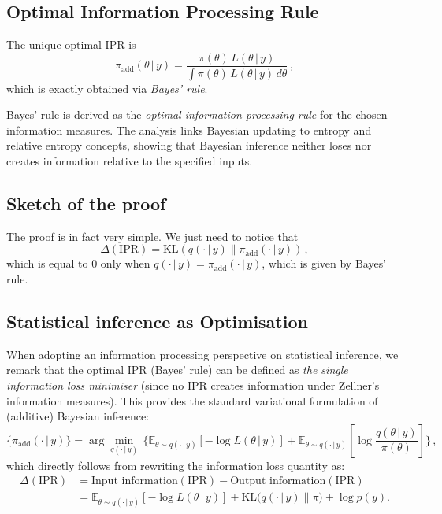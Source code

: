 \documentclass[accepted]{uai2026} %
\def\given{\,|\,}
\theoremstyle{remark}
\begin{document}
\subsection*{Optimal Information Processing Rule}

The unique optimal IPR is
\[
\pi_{\textrm{add}}(\theta \given y)
= \frac{\pi(\theta)\, L(\theta \given y)}
{\int \pi(\theta)\, L(\theta \given y)\, d\theta} \, ,
\]
which is exactly obtained via \emph{Bayes' rule}.

\vspace{0.2cm}

Bayes' rule is derived as the \emph{optimal information processing rule} for the chosen information measures. The analysis links Bayesian updating to entropy and relative entropy concepts, showing that Bayesian inference neither loses nor creates information relative to the specified inputs.


\subsection*{Sketch of the proof}

The proof is in fact very simple. We just need to notice that
$$
\Delta(\text{IPR}) = \mathrm{KL}\left(q(\cdot \given y) \| \pi_{\textrm{add}}(\cdot \given y) \right) \, ,
$$
which is equal to $0$ only when $q(\cdot \given y)=\pi_{\textrm{add}}(\cdot \given y)$, which is given by Bayes' rule.


\subsection*{Statistical inference as Optimisation}

When adopting an information processing perspective on statistical inference, we remark that the optimal IPR (Bayes' rule) can be defined as \emph{the single information loss minimiser} (since no IPR creates information under Zellner's information measures). This provides the standard variational formulation of (additive) Bayesian inference:
$$
\big\{ \pi_{\textrm{add}}(\cdot \given y) \big\} = \arg\min_{q(\cdot\given y)} \, \bigg\{ \mathbb{E}_{\theta\sim q(\cdot\given y)}\left[- \log L(\theta \given y)\right] + \mathbb{E}_{\theta\sim q(\cdot\given y)}\left[\log \frac{q(\theta\given y)}{\pi(\theta)}\right] \bigg\} \, ,
$$
which directly follows from rewriting the information loss quantity as:
\begin{align*}
\Delta(\text{IPR}) & = \text{Input information}(\text{IPR}) - \text{Output information}(\text{IPR}) \\
& = \mathbb{E}_{\theta\sim q(\cdot\given y)}\left[- \log L(\theta \given y)\right] + \mathrm{KL}\big(q(\cdot\given y)\|\pi\big)+\log p(y) .
\end{align*}
\end{document}
